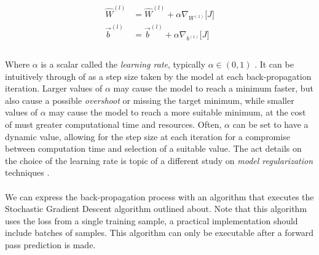 \documentclass[12pt,letterpaper]{article}
\begin{document}
\begin{equation}
\label{update params}
\begin{split}
\hat{W}^{(l)} &= \hat{W}^{(l)} + \alpha \nabla_{W^{(1)}} \big[ J \big] \\
\vec{b}^{(l)} &= \vec{b}^{(l)} + \alpha \nabla_{b^{(1)}} \big[ J \big] \\
\end{split}
\end{equation}

\paragraph*{}Where $\alpha$ is a scalar called the \textit{learning rate}, typically $\alpha \in (0,1)$ \cite{Geron,Petrik}. It can be intuitively through of as a step size taken by the model at each back-propagation iteration. Larger values of $\alpha$ may cause the model to reach a minimum faster, but also cause a possible \textit{overshoot} or missing the target minimum, while smaller values of $\alpha$ may cause the model to reach a more suitable minimum, at the cost of must greater computational time and resources. Often, $\alpha$ can be set to have a dynamic value, allowing for the step size at each iteration for a compromise between computation time and selection of a suitable value. The act details on the choice of the learning rate is topic of a different study on \textit{model regularization} techniques \cite{Goodfellow,James}.

\paragraph*{}We can express the back-propagation process with an algorithm that executes the Stochastic Gradient Descent algorithm outlined about. Note that this algorithm uses the loss from a single training sample, a practical implementation should include batches of samples. This algorithm can only be executable after a forward pass prediction is made.
\end{document}
